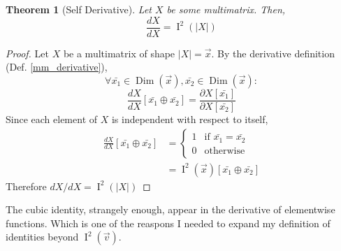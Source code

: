 \documentclass[12pt]{book}
\theoremstyle{plain}
\newtheorem{theorem}{Theorem}[chapter]
\theoremstyle{definition}
\theoremstyle{ppart}
\theoremstyle{case}
\theoremstyle{solution}
\DeclareMathOperator{\Dim}{Dim}
\DeclareMathOperator{\Ident}{I}
\begin{document}
\begin{theorem}[Self Derivative]
\label{self_derivative}
Let $X$ be some multimatrix. Then,
\[ \frac{dX}{dX} = \Ident^2(|X|) \]
\end{theorem}
\begin{proof}
Let $X$ be a multimatrix of shape $|X|=\vec{x}$.
By the derivative definition (Def. \ref{mm_derivative}),
\[
 \forall \bar{x_1} \in \Dim(\vec{x}),
         \bar{x_2} \in \Dim(\vec{x}):
\]
\[
 \frac{dX}{dX}[\bar{x_1} \oplus \bar{x_2}] = 
 \frac{\partial X[\bar{x_1}]}{\partial X[\bar{x_2}]}
\]
Since each element of $X$ is independent with respect to itself,
\begin{align*}
 \frac{dX}{dX}[\bar{x_1} \oplus \bar{x_2}]
 &= \left\{
  \begin{array}{ll}
    1 & \mbox{if } \bar{x_1} = \bar{x_2} \\
    0 & \mbox{otherwise}
  \end{array}
 \right. \\
 &= \Ident^2(\vec{x})[\bar{x_1} \oplus \bar{x_2}]
\end{align*}
Therefore $dX/dX = \Ident^2(|X|)$
\end{proof}

The cubic identity, strangely enough, appear in the derivative of elementwise
functions. Which is one of the reaspons I needed to expand my definition of
identities beyond $\Ident^2(\vec{v})$.
\end{document}

